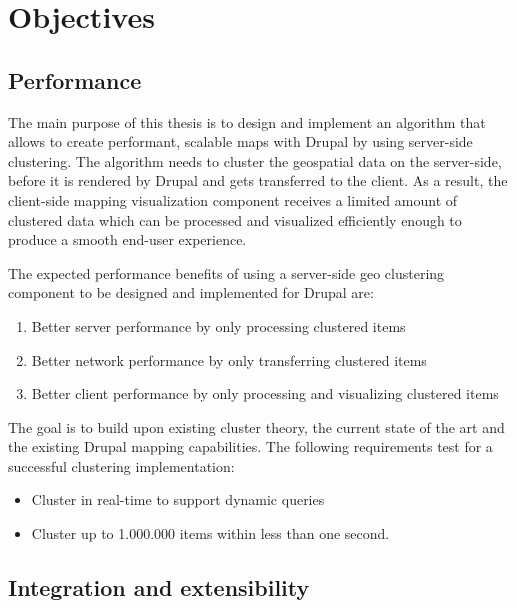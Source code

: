 
%
%

\chapter{Objectives}
\label{chapter:objectives}


\section{Performance}

The main purpose of this thesis is to design and implement an algorithm that allows to create performant, scalable maps with Drupal by using server-side clustering. The algorithm needs to cluster the geospatial data on the server-side, before it is rendered by Drupal and gets transferred to the client. As a result, the client-side mapping visualization component receives a limited amount of clustered data which can be processed and visualized efficiently enough to produce a smooth end-user experience.

The expected performance benefits of using a server-side geo clustering component to be designed and implemented for Drupal are:

\begin{enumerate}

\item Better server performance by only processing clustered items
\item Better network performance by only transferring clustered items 
\item Better client performance by only processing and visualizing clustered items 

\end{enumerate}

The goal is to build upon existing cluster theory, the current state of the art and the existing Drupal mapping capabilities. The following requirements test for a successful clustering implementation:

\begin{itemize}

\item Cluster in real-time to support dynamic queries
\item Cluster up to 1.000.000 items within less than one second.

\end{itemize}


\section{Integration and extensibility}

